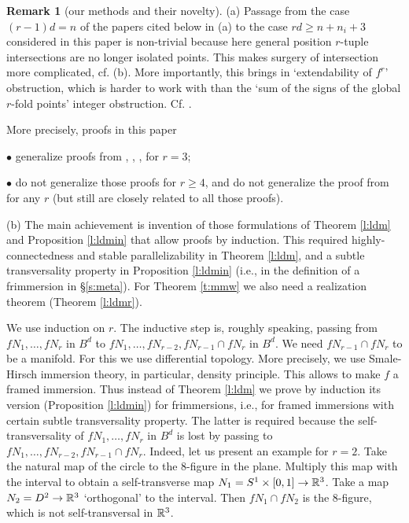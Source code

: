 \documentclass[12pt]{article}
\theoremstyle{plain}
\theoremstyle{definition}
\newtheorem{Remark}[Theorem]{Remark}
\begin{document}
\begin{Remark}[our methods and their novelty]\label{r:imm} (a)
Passage from the case $(r-1)d=n$ of the papers cited below in (a) to the case $rd\ge n+n_i+3$ considered in this paper is non-trivial because here general position $r$-tuple intersections are no longer isolated points.
This makes surgery of intersection more complicated, cf. (b).
More importantly, this brings in `extendability of $f^r$' obstruction, which is harder to work with than the
`sum of the signs of the global $r$-fold points' integer obstruction.
Cf. \cite[Remark 3.1.b]{AMSW}.

More precisely, proofs in this paper

$\bullet$ generalize proofs from \cite[\S2.1]{AMSW}, \cite[\S3.5]{Sk16},
\cite[proof of Theorem 1.1 in pp. 7-8]{Me17}, \cite{Me18} for $r=3$;

$\bullet$ do not generalize those proofs for $r\ge4$, and do not generalize the proof from \cite{MW15}
for any $r$ (but still are closely related to all those proofs).

(b) The main achievement is invention of those formulations of Theorem \ref{l:ldm} and Proposition \ref{l:ldmin} that allow proofs by induction.
This required highly-connectedness and stable parallelizability in Theorem \ref{l:ldm}, and a subtle transversality property in Proposition \ref{l:ldmin} (i.e., in the definition of a frimmersion in \S\ref{s:meta}).
For Theorem \ref{t:mmw} we also need a realization theorem (Theorem \ref{l:ldmr}).

We use induction on $r$.
The inductive step is, roughly speaking, passing from $fN_1,\ldots,fN_r$ in $B^d$ to $fN_1,\ldots,fN_{r-2},fN_{r-1}\cap fN_r$ in $B^d$.
We need  $fN_{r-1}\cap fN_r$ to be a manifold.
For this we use differential topology.
More precisely, we use Smale-Hirsch immersion theory, in particular, density principle.
This allows to make $f$ a framed immersion.
Thus instead of Theorem \ref{l:ldm} we prove by induction its version (Proposition \ref{l:ldmin}) for 
frimmersions, i.e., for framed immersions with certain subtle transversality property.
The latter is required because the self-transversality of $fN_1,\ldots,fN_r$ in $B^d$ is lost by passing to $fN_1,\ldots,fN_{r-2},fN_{r-1}\cap fN_r$. 
Indeed, let us present an example for $r=2$. 
Take the natural map of the circle to the 8-figure in the plane. 
Multiply this map with the interval to obtain a self-transverse map $N_1=S^1\times[0,1]\to{\mathbb R}^3$. 
Take a map $N_2=D^2\to{\mathbb R}^3$ `orthogonal' to the interval.
Then $fN_1\cap fN_2$ is the 8-figure, which is not self-transversal in ${\mathbb R}^3$. 
 

\end{Remark}
\end{document}
